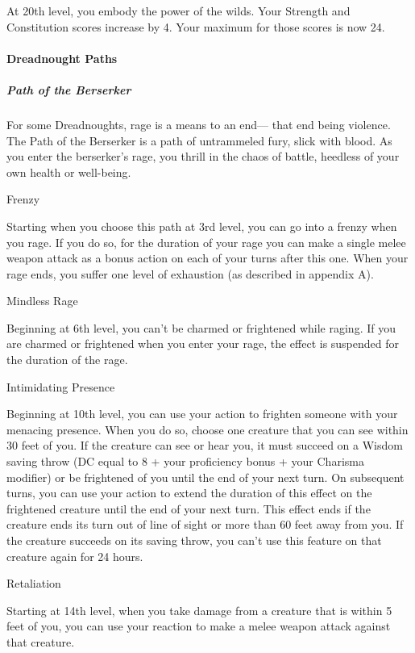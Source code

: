 At 20th level, you embody the power of the wilds. Your Strength and
Constitution scores increase by 4. Your maximum for those scores is now
24.

\paragraph{Dreadnought Paths}\label{dreadnought-subclasses}

\subparagraph{Path of the
Berserker}\label{dreadnought-subclasse-berserker}

For some Dreadnoughts, rage is a means to an end--- that end being
violence. The Path of the Berserker is a path of untrammeled fury, slick
with blood. As you enter the berserker's rage, you thrill in the chaos
of battle, heedless of your own health or well-being.

Frenzy

Starting when you choose this path at 3rd level, you can go into a
frenzy when you rage. If you do so, for the duration of your rage you
can make a single melee weapon attack as a bonus action on each of your
turns after this one. When your rage ends, you suffer one level of
exhaustion (as described in appendix A).

Mindless Rage

Beginning at 6th level, you can't be charmed or frightened while raging.
If you are charmed or frightened when you enter your rage, the effect is
suspended for the duration of the rage.

Intimidating Presence

Beginning at 10th level, you can use your action to frighten someone
with your menacing presence. When you do so, choose one creature that
you can see within 30 feet of you. If the creature can see or hear you,
it must succeed on a Wisdom saving throw (DC equal to 8 + your
proficiency bonus + your Charisma modifier) or be frightened of you
until the end of your next turn. On subsequent turns, you can use your
action to extend the duration of this effect on the frightened creature
until the end of your next turn. This effect ends if the creature ends
its turn out of line of sight or more than 60 feet away from you. If the
creature succeeds on its saving throw, you can't use this feature on
that creature again for 24 hours.

Retaliation

Starting at 14th level, when you take damage from a creature that is
within 5 feet of you, you can use your reaction to make a melee weapon
attack against that creature.

